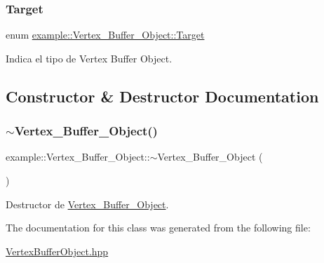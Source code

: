 \subsubsection{\texorpdfstring{Target}{Target}}
{\footnotesize\ttfamily enum \mbox{\hyperlink{classexample_1_1_vertex___buffer___object_a376260819cb29bd5300ce2b9885dedb7}{example\+::\+Vertex\+\_\+\+Buffer\+\_\+\+Object\+::\+Target}}}



Indica el tipo de Vertex Buffer Object. 



\subsection{Constructor \& Destructor Documentation}
\mbox{\label{classexample_1_1_vertex___buffer___object_aaa8d416cc84ac665fea6b3dca3904b6d}} 
\subsubsection{\texorpdfstring{$\sim$Vertex\_Buffer\_Object()}{~Vertex\_Buffer\_Object()}}
{\footnotesize\ttfamily example\+::\+Vertex\+\_\+\+Buffer\+\_\+\+Object\+::$\sim$\+Vertex\+\_\+\+Buffer\+\_\+\+Object (\begin{DoxyParamCaption}{ }\end{DoxyParamCaption})\hspace{0.3cm}{\ttfamily [inline]}}



Destructor de \mbox{\hyperlink{classexample_1_1_vertex___buffer___object}{Vertex\+\_\+\+Buffer\+\_\+\+Object}}. 



The documentation for this class was generated from the following file\+:\begin{DoxyCompactItemize}
\item 
\mbox{\hyperlink{_vertex_buffer_object_8hpp}{Vertex\+Buffer\+Object.\+hpp}}\end{DoxyCompactItemize}
